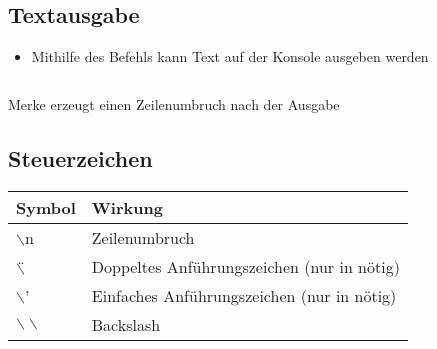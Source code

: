\subsection{Textausgabe}
\begin{frame}
	\slidehead
	\begin{itemize}
		\item Mithilfe des Befehls  kann Text auf der Konsole ausgeben werden
	\end{itemize}
	\begin{columns}
		\begin{column}{6cm}
		\end{column}
		\begin{column}{7cm}
		\end{column}
	\end{columns}
	\vspace{0.25cm}
	\begin{block}{Merke}
		 erzeugt einen Zeilenumbruch nach der Ausgabe
	\end{block}
\end{frame}

\subsection{Steuerzeichen}
\begin{frame}
	\slidehead

	\begin{table}[htbp]
		\begin{tabular}{|l|l|}
			\hline
			\textbf{Symbol} & \textbf{Wirkung} \\ \hline
			$\backslash$n & Zeilenumbruch \\ \hline
			$\backslash$\" & Doppeltes Anführungszeichen  (nur in \pythoninline{" "} nötig) \\ \hline
			$\backslash$' & Einfaches Anführungszeichen (nur in \pythoninline{' '} nötig) \\ \hline
			$\backslash \backslash$ & Backslash \\ \hline
		\end{tabular}
		\label{}
	\end{table}

\end{frame}

